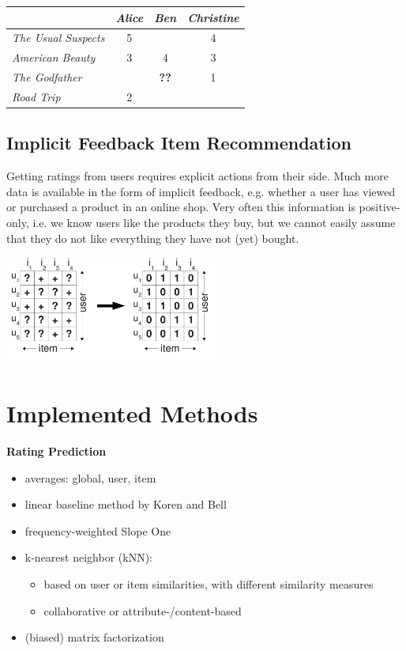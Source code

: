 \documentclass[a4paper, foldmark, 12pt]{leaflet}
\newcommand{\UserI}{\textit{Alice}}
\newcommand{\UserII}{\textit{Ben}}
\newcommand{\UserIII}{\textit{Christine}}
\newcommand{\MovieI}{\textit{The Usual Suspects}}
\newcommand{\MovieII}{\textit{American Beauty}}
\newcommand{\MovieIII}{\textit{The Godfather}}
\newcommand{\MovieIV}{\textit{Road Trip}}
\begin{document}
\begin{center}
      \begin{tabular}{|l||c|c|c|}
        \hline
	           & \UserI & \UserII & \UserIII \\ \hline
	\hline
	\MovieI    &  5   &     & 4     \\ \hline
	\MovieII   &  3   & 4   & 3    \\ \hline
	\MovieIII  &      & \textbf{??}    & 1    \\ \hline
	\MovieIV   &  2   &     &        \\ \hline
      \end{tabular}
\end{center}


\subsection{Implicit Feedback Item Recommendation}

Getting ratings from users requires explicit actions from their side.
Much more data is available in the form of implicit feedback,
e.g. whether a user has viewed or purchased a product in an online shop.
Very often this information is positive-only,
i.e. we know users like the products they buy, but we cannot easily assume
that they do not like everything they have not (yet) bought.

\begin{center}
	\includegraphics[width=7.0cm]{fig/interpretation_single.pdf}
\end{center}

\newpage 

\section{Implemented Methods}
\textbf{Rating Prediction}
\begin{itemize}
	\item averages: global, user, item
	\item linear baseline method by Koren and Bell
        \item frequency-weighted Slope One
	\item k-nearest neighbor (kNN):
		\begin{itemize}
			\item based on user or item similarities, with different similarity measures
			\item collaborative or attribute-/content-based
		\end{itemize}
	\item (biased) matrix factorization
\end{itemize}
\end{document}
